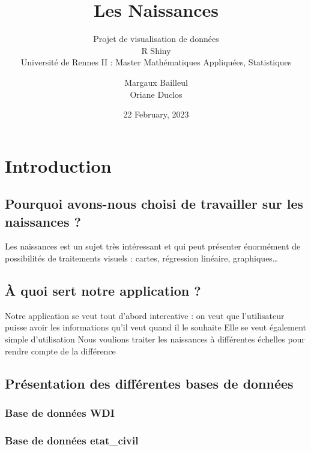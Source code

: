 \documentclass[
]{article}
\title{Les Naissances}
\subtitle{Projet de visualisation de données\\
R Shiny\\
Université de Rennes II : Master Mathématiques Appliquées, Statistiques}
\author{Margaux Bailleul\\
Oriane Duclos}
\date{22 February, 2023}
\begin{document}
\maketitle

{
\setcounter{tocdepth}{2}
\tableofcontents
}
\hypertarget{introduction}{%
\section{Introduction}\label{introduction}}

\hypertarget{pourquoi-avons-nous-choisi-de-travailler-sur-les-naissances}{%
\subsection{Pourquoi avons-nous choisi de travailler sur les naissances
?}\label{pourquoi-avons-nous-choisi-de-travailler-sur-les-naissances}}

Les naissances est un sujet très intéressant et qui peut présenter
énormément de possibilités de traitements visuels : cartes, régression
linéaire, graphiques\ldots{}

\hypertarget{uxe0-quoi-sert-notre-application}{%
\subsection{À quoi sert notre application
?}\label{uxe0-quoi-sert-notre-application}}

Notre application se veut tout d'abord intercative : on veut que
l'utilisateur puisse avoir les informations qu'il veut quand il le
souhaite Elle se veut également simple d'utilisation Nous voulions
traiter les naissances à différentes échelles pour rendre compte de la
différence

\hypertarget{pruxe9sentation-des-diffuxe9rentes-bases-de-donnuxe9es}{%
\subsection{Présentation des différentes bases de
données}\label{pruxe9sentation-des-diffuxe9rentes-bases-de-donnuxe9es}}

\hypertarget{base-de-donnuxe9es-wdi}{%
\subsubsection{Base de données WDI}\label{base-de-donnuxe9es-wdi}}

\hypertarget{base-de-donnuxe9es-etat_civil}{%
\subsubsection{Base de données
etat\_civil}\label{base-de-donnuxe9es-etat_civil}}
\end{document}
